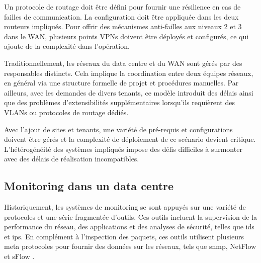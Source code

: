 
Un protocole de routage doit être défini pour fournir une résilience en cas de failles de communication. La configuration doit être appliquée dans les deux routeurs impliqués. Pour offrir des mécanismes anti-failles aux niveaux 2 et 3 dans le WAN, plusieurs points VPNs doivent être déployés et configurés, ce qui ajoute de la complexité dans l'opération.

Traditionnellement, les réseaux du data centre et du WAN sont gérés  par des responsables distincts. Cela implique la coordination entre deux équipes réseaux, en général via une structure formelle de projet et procédures manuelles. Par ailleurs, avec les demandes de divers tenants, ce modèle introduit des délais ainsi que des problèmes d'extensibilités supplémentaires lorsqu'ils requièrent des VLANs ou protocoles de routage dédiés.

Avec l'ajout de sites et tenants, une variété de pré-requis et configurations doivent être gérés et la complexité de déploiement de ce scénario devient critique. L'hétérogénéité des systèmes impliqués impose des défis difficiles à surmonter avec des délais de réalisation incompatibles. \cite{leveragingSDNCloudDCWAN} \cite{zkCloudIntelligentNetwork}


\subsection{Monitoring dans un data centre}

Historiquement, les systèmes de monitoring se sont appuyés sur une variété de protocoles et une série fragmentée d'outils. Ces outils incluent la supervision de la performance du réseau, des applications et des analyses de sécurité, telles que \gls{ids} et \gls{ips}. En complément à l'inspection des paquets, ces outils utilisent plusieurs meta protocoles pour fournir des données sur les réseaux, tels que \gls{snmp}, NetFlow \cite{netflow} et sFlow \cite{sflow}.

